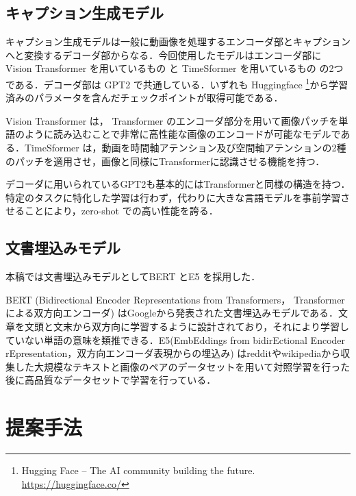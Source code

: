 \documentclass[11pt,a4j]{jreport}
\begin{document}
\section{キャプション生成モデル}
\label{sec:caption}

キャプション生成モデルは一般に動画像を処理するエンコーダ部とキャプションへと変換するデコーダ部からなる．今回使用したモデルはエンコーダ部に Vision Transformer \cite{dosovitskiy2020vit} を用いているもの \cite{vit+gpt2} と TimeSformer \cite{Bertasius2021tsf} を用いているもの \cite{tsf+gpt2} の2つである．デコーダ部は GPT2 \cite{radford2019gpt2} で共通している．いずれも Huggingface \footnote{Hugging Face – The AI community building the future. \url{https://huggingface.co/}}から学習済みのパラメータを含んだチェックポイントが取得可能である．

Vision Transformer は， Transformer \cite{vaswani2017transformer} のエンコーダ部分を用いて画像パッチを単語のように読み込むことで非常に高性能な画像のエンコードが可能なモデルである．TimeSformer は，動画を時間軸アテンション及び空間軸アテンションの2種のパッチを適用させ，画像と同様にTransformerに認識させる機能を持つ．

デコーダに用いられているGPT2も基本的にはTransformerと同様の構造を持つ．特定のタスクに特化した学習は行わず，代わりに大きな言語モデルを事前学習させることにより，zero-shot での高い性能を誇る．

\section{文書埋込みモデル}
\label{sec:emb}

本稿では文書埋込みモデルとしてBERT \cite{devlin2018bert} とE5 \cite{wang2022e5} を採用した．

BERT (Bidirectional Encoder Representations from Transformers， Transformer による双方向エンコーダ) はGoogleから発表された文書埋込みモデルである．文章を文頭と文末から双方向に学習するように設計されており，それにより学習していない単語の意味を類推できる．E5(EmbEddings from bidirEctional Encoder rEpresentation，双方向エンコーダ表現からの埋込み) はredditやwikipediaから収集した大規模なテキストと画像のペアのデータセットを用いて対照学習を行った後に高品質なデータセットで学習を行っている．

\chapter{提案手法}
\label{our-method}
\end{document}
